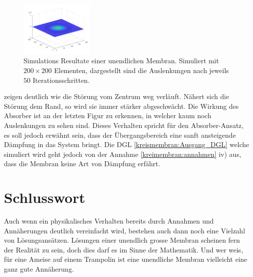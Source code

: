 \begin{figure}
\begin{center}
		\includegraphics[width=0.32\textwidth]{papers/kreismembran/images/sim_2_6.png}
		\caption{Simulations Resultate einer unendlichen Membran. Simuliert mit $ 200 \times 200 $ Elementen, dargestellt sind die Auslenkungen nach jeweils $ 50 $ Iterationsschritten.}
		\label{kreismembran:im:simres_unendlich}
		
	\end{center}	
\end{figure}
zeigen deutlich wie die Störung vom Zentrum weg verläuft.
Nähert sich die Störung dem Rand, so wird sie immer stärker abgeschwächt.
Die Wirkung des Absorber ist an der letzten Figur zu erkennen, in welcher kaum noch Auslenkungen zu sehen sind.
Dieses Verhalten spricht für den Absorber-Ansatz, es soll jedoch erwähnt sein, dass der Übergangsbereich eine sanft ansteigende Dämpfung in das System bringt.
Die DGL \ref{kreismembran:Ausgang_DGL} welche simuliert wird geht jedoch von der Annahme \ref{kreimembran:annahmen} iv) aus, dass die Membran keine Art von Dämpfung erfährt.

\section{Schlusswort}
Auch wenn ein physikalisches Verhalten bereits durch Annahmen und Annäherungen deutlich vereinfacht wird, bestehen auch dann noch eine Vielzahl von Lösungsansätzen.
Lösungen einer unendlich grosse Membran scheinen fern der Realität zu sein, doch dies darf es im Sinne der Mathematik.
Und wer weis, für eine Ameise auf einem Trampolin ist eine unendliche Membran vielleicht eine ganz gute Annäherung. 







